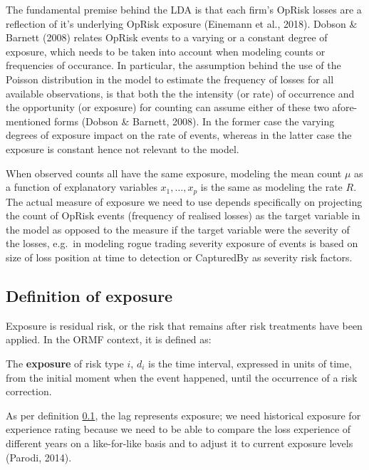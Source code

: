 \documentclass{DissertateUSU}
\begin{document}
The fundamental premise behind the LDA is that each firm's OpRisk losses
are a reflection of it's underlying OpRisk exposure (Einemann et al.,
2018). Dobson \& Barnett (2008) relates OpRisk events to a varying or a
constant degree of exposure, which needs to be taken into account when
modeling counts or frequencies of occurance. In particular, the
assumption behind the use of the Poisson distribution in the model to
estimate the frequency of losses for all available observations, is that
both the the intensity (or rate) of occurrence and the opportunity (or
exposure) for counting can assume either of these two afore-mentioned
forms (Dobson \& Barnett, 2008). In the former case the varying degrees
of exposure impact on the rate of events, whereas in the latter case the
exposure is constant hence not relevant to the model.\medskip

When observed counts all have the same exposure, modeling the mean count
\(\mu\) as a function of explanatory variables \(x_{1},\ldots,x_{p}\) is
the same as modeling the rate \(R\). The actual measure of exposure we
need to use depends specifically on projecting the count of OpRisk
events (frequency of realised losses) as the target variable in the
model as opposed to the measure if the target variable were the severity
of the losses, e.g.~in modeling rogue trading severity exposure of
events is based on size of loss position at time to detection or
CapturedBy as severity risk factors.

\subsection{Definition of exposure}
\label{ssec:Definition of exposure}

Exposure is residual risk, or the risk that remains after risk
treatments have been applied. In the ORMF context, it is defined as:

\begin{definition}
The  \textbf{exposure} of risk type $i$, $d_{i}$ is the time interval, expressed in units of time, from the initial moment when the event happened, until the occurrence of a risk correction.
\end{definition}

As per definition \ref{ssec:Definition of exposure}, the lag represents
exposure; we need historical exposure for experience rating because we
need to be able to compare the loss experience of different years on a
like-for-like basis and to adjust it to current exposure levels (Parodi,
2014).
\end{document}

